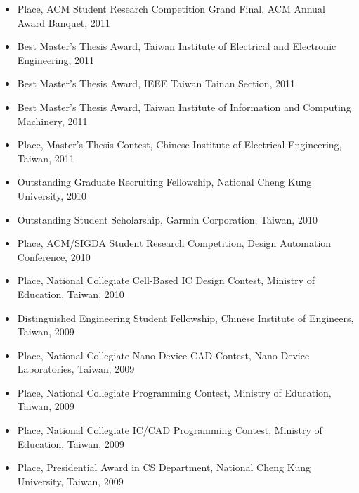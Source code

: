 \documentclass[A4,11pt]{article}
\begin{document}
\begin{itemize}
    \item {} Place, ACM Student Research Competition Grand Final, ACM Annual Award Banquet, 2011
    \item Best Master’s Thesis Award, Taiwan Institute of Electrical and Electronic Engineering, 2011
    \item Best Master’s Thesis Award, IEEE Taiwan Tainan Section, 2011
    \item Best Master’s Thesis Award, Taiwan Institute of Information and Computing Machinery, 2011
    \item {} Place, Master’s Thesis Contest, Chinese Institute of Electrical Engineering, Taiwan, 2011
    \item Outstanding Graduate Recruiting Fellowship, National Cheng Kung University, 2010
    \item Outstanding Student Scholarship, Garmin Corporation, Taiwan, 2010
    \item {} Place, ACM/SIGDA Student Research Competition, Design Automation Conference, 2010
    \item {} Place, National Collegiate Cell-Based IC Design Contest, Ministry of Education, Taiwan, 2010
    \item Distinguished Engineering Student Fellowship, Chinese Institute of Engineers, Taiwan, 2009
    \item {} Place, National Collegiate Nano Device CAD Contest, Nano Device Laboratories, Taiwan, 2009
    \item {} Place, National Collegiate Programming Contest, Ministry of Education, Taiwan, 2009
    \item {} Place, National Collegiate IC/CAD Programming Contest, Ministry of Education, Taiwan, 2009
    \item {} Place, Presidential Award in CS Department, National Cheng Kung University, Taiwan, 2009

 \end{itemize}

\end{document}
